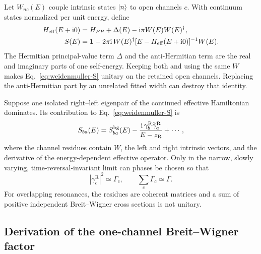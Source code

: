Let $W_{nc}(E)$ couple intrinsic states $\lvert n \rangle$ to open channels $c$.
With continuum states normalized per unit energy, define
\begin{align}
  H_{\mathrm{eff}}(E+\mathrm{i}0)
  &=H_{PP}+\Delta(E)-\mathrm{i}\pi W(E)W(E)^\dagger,
  \label{eq:weidenmuller-effective-H}\\
  S(E)
  &=\mathbf{1}-2\pi\mathrm{i}\,
  W(E)^\dagger
  [E-H_{\mathrm{eff}}(E+\mathrm{i}0)]^{-1}
  W(E).
  \label{eq:weidenmuller-S}
\end{align}
The Hermitian principal-value term $\Delta$ and the anti-Hermitian term are
the real and imaginary parts of one self-energy.  Keeping both and using the
same $W$ makes Eq.~\eqref{eq:weidenmuller-S} unitary on the retained open
channels.  Replacing the anti-Hermitian part by an unrelated fitted width can
destroy that identity.

Suppose one isolated right--left eigenpair of the continued effective
Hamiltonian dominates.  Its contribution to
Eq.~\eqref{eq:weidenmuller-S} is
\begin{equation}
  S_{ba}(E)
  =S_{ba}^{\mathrm{bg}}(E)
  -\frac{\mathrm{i}\,\gamma_b^{\mathrm R}
  \widetilde\gamma_a^{\mathrm R}}
  {E-z_{\mathrm R}}
  +\cdots,
  \label{eq:multichannel-pole-S}
\end{equation}
where the channel residues contain $W$, the left and right intrinsic vectors,
and the derivative of the energy-dependent effective operator.  Only in the
narrow, slowly varying, time-reversal-invariant limit can phases be chosen so
that
\begin{equation}
  |\gamma_c^{\mathrm R}|^2\simeq\Gamma_c,
  \qquad
  \sum_c\Gamma_c\simeq\Gamma.
  \label{eq:narrow-partial-width-identification}
\end{equation}
For overlapping resonances, the residues are coherent matrices and a sum of
positive independent Breit--Wigner cross sections is not unitary.

\subsection{Derivation of the one-channel Breit--Wigner factor}
\label{subsec:breit-wigner-derivation}

